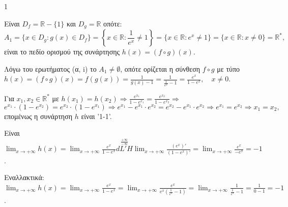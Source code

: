 \begin{ylh}{1}
    \item [Ύλη από εικόνα]
\end{ylh}
\begin{alist}
\item
    \begin{rlist}
        \item Είναι $D_f = \mathbb{R} - \{1\}$ και $D_g = \mathbb{R}$ οπότε:
        \[ A_1 = \{x \in D_g : g(x) \in D_f\} = \left\{x \in \mathbb{R} : \frac{1}{e^x} \neq 1\right\} = \{x \in \mathbb{R} : e^x \neq 1\} = \{x \in \mathbb{R} : x \neq 0\} = \mathbb{R}^*, \]
        είναι το πεδίο ορισμού της συνάρτησης $h(x) = (f \circ g)(x)$.
        \item Λόγω του ερωτήματος (α, i) το $A_1 \neq \emptyset$, οπότε ορίζεται η σύνθεση $f \circ g$ με
        τύπο $h(x) = (f \circ g)(x) = f(g(x)) = \frac{1}{g(x)-1} = \frac{1}{\frac{1}{e^x}-1} = \frac{e^x}{1-e^x}, \quad x \neq 0$.
    \end{rlist}
\item Για $x_1, x_2 \in \mathbb{R}^*$ με $h(x_1) = h(x_2) \Rightarrow \frac{e^{x_1}}{1-e^{x_1}} = \frac{e^{x_2}}{1-e^{x_2}} \Rightarrow$
    \[ e^{x_1} \cdot (1-e^{x_2}) = e^{x_2} \cdot (1-e^{x_1}) \Rightarrow e^{x_1} - e^{x_1} \cdot e^{x_2} = e^{x_2} - e^{x_1} \cdot e^{x_2} \Rightarrow e^{x_1} = e^{x_2} \Rightarrow x_1 = x_2, \]
    επομένως η συνάρτηση $h$ είναι '1-1'.
\item Είναι $\lim_{x \to +\infty} h(x) = \lim_{x \to +\infty} \frac{e^x}{1-e^x} \stackrel{\frac{+\infty}{-\infty}}{dL'H} \lim_{x \to +\infty} \frac{(e^x)'}{(1-e^x)'} = \lim_{x \to +\infty} \frac{e^x}{-e^x} = -1$.

    Εναλλακτικά: $\lim_{x \to +\infty} h(x) = \lim_{x \to +\infty} \frac{e^x}{1-e^x} = \lim_{x \to +\infty} \frac{e^x}{e^x\left(\frac{1}{e^x}-1\right)} = \lim_{x \to +\infty} \frac{1}{\frac{1}{e^x}-1} = \frac{1}{0-1} = -1$.
\end{alist}